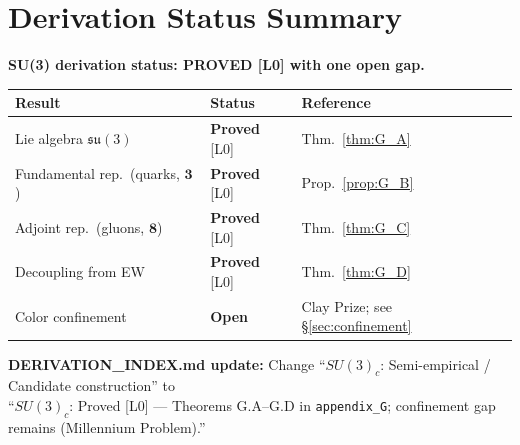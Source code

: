\documentclass[12pt,a4paper]{article}
\theoremstyle{definition}
\theoremstyle{remark}
\begin{document}
\section{Derivation Status Summary}
\label{sec:status}

\begin{resultbox}
\textbf{SU(3) derivation status: PROVED [L0] with one open gap.}

\begin{center}
\begin{tabular}{lll}
  \toprule
  \textbf{Result} & \textbf{Status} & \textbf{Reference} \\
  \midrule
  Lie algebra $\mathfrak{su}(3)$ & \textbf{Proved} [L0] & Thm.~\ref{thm:G_A} \\
  Fundamental rep.\ (quarks, $\mathbf{3}$) & \textbf{Proved} [L0] & Prop.~\ref{prop:G_B} \\
  Adjoint rep.\ (gluons, $\mathbf{8}$) & \textbf{Proved} [L0] & Thm.~\ref{thm:G_C} \\
  Decoupling from EW & \textbf{Proved} [L0] & Thm.~\ref{thm:G_D} \\
  Color confinement & \textbf{Open} & Clay Prize; see §\ref{sec:confinement} \\
  \bottomrule
\end{tabular}
\end{center}

\textbf{DERIVATION\_INDEX.md update:}
Change ``$SU(3)_c$: Semi-empirical / Candidate construction'' to\\
``$SU(3)_c$: Proved [L0] --- Theorems G.A--G.D in \texttt{appendix\_G};
confinement gap remains (Millennium Problem).''
\end{resultbox}

\ifdefined\INCLUDEMODE
\else
  
\end{document}
